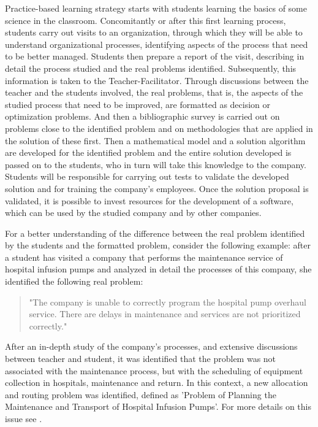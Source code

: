 \documentclass[preprint,12pt,authoryear]{elsarticle}
\begin{document}
Practice-based learning strategy starts with students learning the basics of some science in the classroom. Concomitantly or after this first learning process, students carry out visits to an organization, through which they will be able to understand organizational processes, identifying aspects of the process that need to be better managed. Students then prepare a report of the visit, describing in detail the process studied and the real problems identified. Subsequently, this information is taken to the Teacher-Facilitator. Through discussions between the teacher and the students involved, the real problems, that is, the aspects of the studied process that need to be improved, are formatted as decision or optimization problems. And then a bibliographic survey is carried out on problems close to the identified problem and on methodologies that are applied in the solution of these first. Then a mathematical model and a solution algorithm are developed for the identified problem and the entire solution developed is passed on to the students, who in turn will take this knowledge to the company. Students will be responsible for carrying out tests to validate the developed solution and for training the company's employees.  Once the solution proposal is validated, it is possible to invest resources for the development of a software, which can be used by the studied company and by other companies.

For a better understanding of the difference between the real problem identified by the students and the formatted problem, consider the following example: after a student has visited a company that performs the maintenance service of hospital infusion pumps and analyzed in detail the processes of this company, she identified the following real problem:

\begin{quote}
"The company is unable to correctly program the hospital pump overhaul service. There are delays in maintenance and services are not prioritized correctly."
\end{quote}

After an in-depth study of the company's processes, and extensive discussions between teacher and student, it was identified that the problem was not associated with the maintenance process, but with the scheduling of equipment collection in hospitals, maintenance and return. In this context, a new allocation and routing problem was identified, defined as 'Problem of Planning the Maintenance and Transport of Hospital Infusion Pumps'. For more details on this issue see \cite{FragaEtAl2021}.
\end{document}
